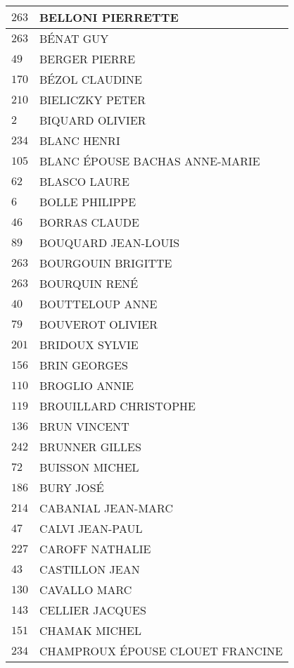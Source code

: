 \begin{xltabular}{\linewidth}{|l|X|}
    \hline
    $263$ & BELLONI PIERRETTE \\
    \hline
    $263$ & BÉNAT GUY \\
    \hline
    $49$ & BERGER PIERRE \\
    \hline
    $170$ & BÉZOL CLAUDINE \\
    \hline
    $210$ & BIELICZKY PETER \\
    \hline
    $2$ & BIQUARD OLIVIER \\
    \hline
    $234$ & BLANC HENRI \\
    \hline
    $105$ & BLANC ÉPOUSE BACHAS ANNE-MARIE \\
    \hline
    $62$ & BLASCO LAURE \\
    \hline
    $6$ & BOLLE PHILIPPE \\
    \hline
    $46$ & BORRAS CLAUDE \\
    \hline
    $89$ & BOUQUARD JEAN-LOUIS \\
    \hline
    $263$ & BOURGOUIN BRIGITTE \\
    \hline
    $263$ & BOURQUIN RENÉ \\
    \hline
    $40$ & BOUTTELOUP ANNE \\
    \hline
    $79$ & BOUVEROT OLIVIER \\
    \hline
    $201$ & BRIDOUX SYLVIE \\
    \hline
    $156$ & BRIN GEORGES \\
    \hline
    $110$ & BROGLIO ANNIE \\
    \hline
    $119$ & BROUILLARD CHRISTOPHE \\
    \hline
    $136$ & BRUN VINCENT \\
    \hline
    $242$ & BRUNNER GILLES \\
    \hline
    $72$ & BUISSON MICHEL \\
    \hline
    $186$ & BURY JOSÉ \\
    \hline
    $214$ & CABANIAL JEAN-MARC \\
    \hline
    $47$ & CALVI JEAN-PAUL \\
    \hline
    $227$ & CAROFF NATHALIE \\
    \hline
    $43$ & CASTILLON JEAN \\
    \hline
    $130$ & CAVALLO MARC \\
    \hline
    $143$ & CELLIER JACQUES \\
    \hline
    $151$ & CHAMAK MICHEL \\
    \hline
    $234$ & CHAMPROUX ÉPOUSE CLOUET FRANCINE \\

\end{xltabular}
